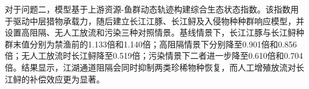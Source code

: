 对于问题二，模型基于上游资源-鱼群动态轨迹构建综合生态状态指数。该指数用于驱动中层猎物承载力，随后建立长江江豚、长江鲟及入侵物种种群响应模型，并设置高阻隔、无人工放流和污染三种对照情景。基线情景下，长江江豚与长江鲟种群末值分别为禁渔前的1.133倍和1.140倍；高阻隔情景下分别降至0.901倍和0.856倍；无人工放流时长江鲟降至0.519倍；污染情景下二者进一步降至0.610倍和0.704倍。结果显示，江湖通道阻隔会同时抑制两类珍稀物种恢复，而人工增殖放流对长江鲟的补偿效应更为显著。